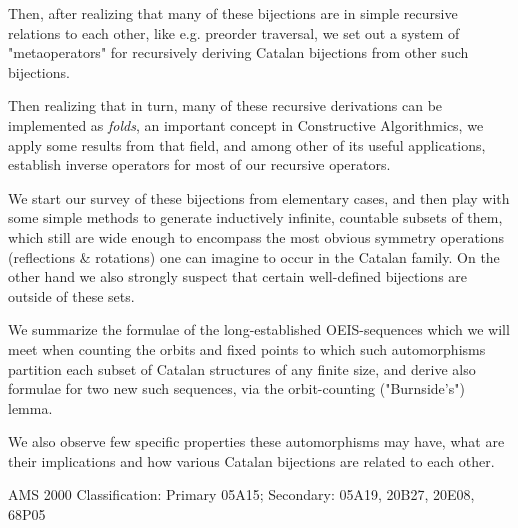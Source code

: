 \documentclass[11pt]{article} %
\begin{document}
Then, after realizing that many of these bijections are in simple recursive
relations to each other, like e.g. preorder traversal,
we set out a system
of "metaoperators" for recursively deriving Catalan bijections from other such
bijections.

Then realizing that in turn, many of these recursive derivations can
be implemented as {\em folds}, an important concept in Constructive
Algorithmics, we apply some results from that field, and among other
of its useful applications, establish inverse operators for most of our
recursive operators.

We start our survey of these bijections from
elementary cases, and then play with some simple methods to
generate inductively infinite, countable subsets of them,
which still are wide enough to encompass the most
obvious symmetry operations (reflections \& rotations) one
can imagine to occur in the Catalan family.
On the other hand we also strongly suspect that certain well-defined
bijections are outside of these sets.

We summarize the formulae of the long-established OEIS-sequences
which we will meet when counting the orbits and fixed points
to which such automorphisms partition each subset of
Catalan structures of any finite size, and derive also formulae
for two new such sequences, via the orbit-counting ("Burnside's") lemma.

We also observe few specific properties these automorphisms may
have, what are their implications and how various
Catalan bijections are related to each other.

\vspace{0.7\baselineskip}
AMS 2000 Classification: Primary 05A15; Secondary: 05A19, 20B27, 20E08, 68P05 \\

\end{document}
